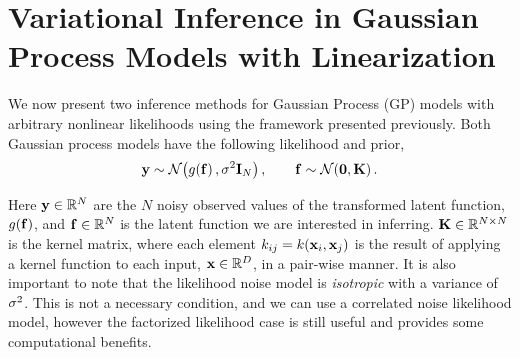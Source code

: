 \documentclass{article} %
\begin{document}
\section{Variational Inference in Gaussian Process Models with Linearization}
\label{sec:gpmod}

We now present two inference methods for Gaussian Process (GP) models
\cite{Rasmussen2006} with arbitrary nonlinear likelihoods using the framework
presented previously.  Both Gaussian process models have the following
likelihood and prior,
\begin{equation}
    \mathbf{y} \sim \mathcal{N}\!\left({g\!\left({{\mathbf{f}}}\right), \sigma^2\mathbf{I}_{N}}\right), \qquad
    \mathbf{f} \sim \mathcal{N}\!\left({\mathbf{0}, \mathbf{K}}\right).
    \label{eq:gplikeprior}
\end{equation}

Here $\mathbf{y} \in \mathbb{R}^{N}$ are the $N$ noisy observed values of the transformed
latent function, $g\!\left({{\mathbf{f}}}\right)$, and $\mathbf{f} \in \mathbb{R}^{N}$ is the latent
function we are interested in inferring. $\mathbf{K} \in \mathbb{R}^{N\times N}$ is the
kernel matrix, where each element $k_{ij} = k\!\left({\mathbf{x}_i,
    \mathbf{x}_j}\right)$ is the result of applying a kernel function to each input,
$\mathbf{x} \in \mathbb{R}^{D}$, in a pair-wise manner. It is also important to note that
the likelihood noise model is \emph{isotropic} with a variance of $\sigma^2$. This
is not a necessary condition, and we can use a correlated noise likelihood
model, however the factorized likelihood case is still useful and provides some
computational benefits. 
    
\end{document}
